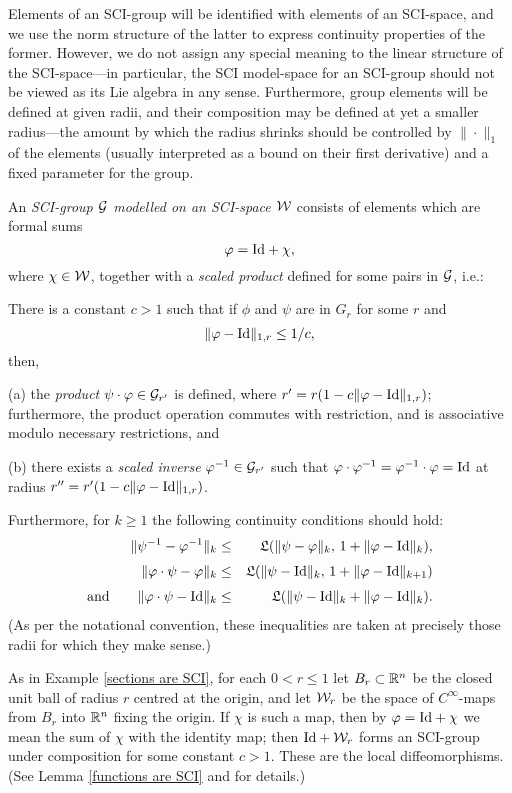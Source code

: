 \documentclass{article}
\begin{document}
Elements of an SCI-group will be identified with elements of an SCI-space, and we use the norm structure of the latter to express continuity properties of the former.  However, we do not assign any special meaning to the linear structure of the SCI-space---in particular, the SCI model-space for an SCI-group should not be viewed as its Lie algebra in any sense.  Furthermore, group elements will be defined at given radii, and their composition may be defined at yet a smaller radius---the amount by which the radius shrinks should be controlled by $\|\cdot\|_1$ of the elements (usually interpreted as a bound on their first derivative) and a fixed parameter for the group.

\begin{defn}\label{SCI group}
An \emph{SCI-group $\mathcal{G}$ modelled on an SCI-space $\mathcal{W}$} consists of elements which are formal sums
$$\varphi = \textrm{Id} + \chi,$$
where $\chi \in \mathcal{W}$, together with a \emph{scaled product} defined for some pairs in $\mathcal{G}$, i.e.:

There is a constant $c>1$ such that if $\phi$ and $\psi$ are in $G_r$ for some $r$ and
$$\|\varphi-\textrm{Id}\|_{1,r} \leq 1/c,$$
then,

(a) the \emph{product} $\psi \cdot \varphi \in \mathcal G_{r'}$ is defined, where $r'=r(1-c\|\varphi-\textrm{Id}\|_{1,r})$; furthermore, the product operation commutes with restriction, and is associative modulo necessary restrictions, and

(b) there exists a \emph{scaled inverse} $\varphi^{-1} \in \mathcal{G}_{r'}$ such that $\varphi\cdot\varphi^{-1} = \varphi^{-1}\cdot\varphi = \textrm{Id}$ at radius $r''=r'(1-c\|\varphi-\textrm{Id}\|_{1,r})$.

Furthermore, for $k\geq1$ the following continuity conditions should hold:
\begin{eqnarray}
\|\psi^{-1}-\phi^{-1}\|_k &\leq& \LP(\|\psi-\phi\|_k,\,1+\|\phi-\Id\|_k) \label{inverse estimate}, \\[3pt]
\|\phi\cdot\psi - \phi\|_k &\leq& \LP(\|\psi-\Id\|_k,\, 1+\|\phi-\Id\|_{k+1}) \label{composition estimate 1} \\[3pt]
\textnormal{and} \qquad
\|\phi\cdot\psi - \Id\|_k &\leq& \LP(\|\psi-\Id\|_k + \|\phi-\Id\|_k). \label{composition estimate 2}
\end{eqnarray}
(As per the notational convention, these inequalities are taken at precisely those radii for which they make sense.)
\end{defn}

\begin{example}\label{local diffeo are SCI}
As in Example \ref{sections are SCI}, for each $0<r\leq1$ let $B_r \subset \mathbb R^n$ be the closed unit ball of radius $r$ centred at the origin, and let $\mathcal{W}_r$ be the space of $C^\infty$-maps from $B_r$ into $\mathbb R^n$ fixing the origin.  If $\chi$ is such a map, then by $\varphi = \textrm{Id} + \chi$ we mean the sum of $\chi$ with the identity map; then $\textrm{Id} + \mathcal{W}_r$ forms an SCI-group under composition for some constant $c>1$.  These are the local diffeomorphisms. (See Lemma \ref{functions are SCI} and \cite{Conn} for details.)
\end{example}
\end{document}
